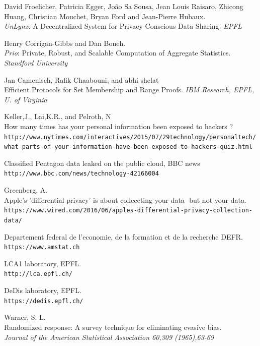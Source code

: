 \documentclass{article}
\begin{document}
\newpage
\begin{thebibliography}{9}

David Froelicher, Patricia Egger, João Sa Sousa, Jean Louis Raisaro, Zhicong Huang, Christian Mouchet, Bryan Ford and Jean-Pierre Hubaux.\\
\textit{UnLynx:} A Decentralized System for Privacy-Conscious Data Sharing. 
\textit{EPFL}
 
Henry Corrigan-Gibbs and Dan Boneh.\\
\textit{Prio}: Private, Robust, and Scalable Computation of Aggregate Statistics.
\textit{Standford University}


Jan Camenisch, Rafik Chaabouni, and abhi shelat\\
Efficient Protocols for Set Membership and Range Proofs.
\textit{IBM Research, EPFL, U. of Virginia}

Keller,J., Lai,K.R., and Pelroth, N\\
How many times has your personal information been exposed to hackers ?
\\\texttt{http://www.nytimes.com/interactives/2015/07/29technology/personaltech/what-parts-of-your-information-have-been-exposed-to-hackers-quiz.html}

Classified Pentagon data leaked on the public cloud, BBC news
\\\texttt{http://www.bbc.com/news/technology-42166004}

Greenberg, A.\\
Apple's 'differential privacy' is about colleccting your data- but not your data.
\\\texttt{https://www.wired.com/2016/06/apples-differential-privacy-collection-data/}

Departement federal de l'economie, de la formation et de la recherche DEFR.
\\\texttt{https://www.amstat.ch}

LCA1 laboratory, EPFL.
\\\texttt{http://lca.epfl.ch/}

DeDis laboratory, EPFL.
\\\texttt{https://dedis.epfl.ch/}

Warner, S. L.\\
Randomized response: A survey technique for eliminating evasive bias.\\
\textit{Journal of the American Statistical Association 60,309 (1965),63-69}


\end{thebibliography}
\end{document}
